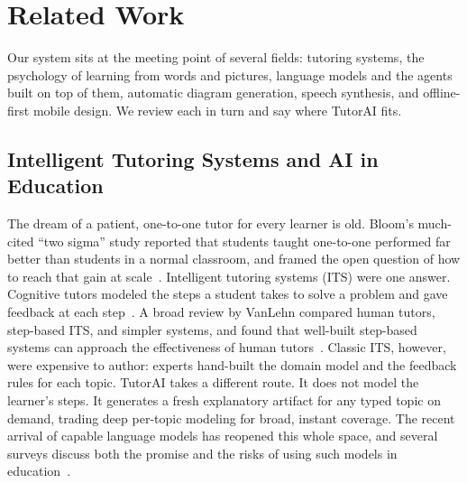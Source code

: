 \documentclass[conference]{IEEEtran}
\begin{document}
\section{Related Work}
\label{sec:related}

Our system sits at the meeting point of several fields: tutoring systems,
the psychology of learning from words and pictures, language models and the
agents built on top of them, automatic diagram generation, speech synthesis,
and offline-first mobile design. We review each in turn and say where TutorAI
fits.

\subsection{Intelligent Tutoring Systems and AI in Education}
The dream of a patient, one-to-one tutor for every learner is old. Bloom's
much-cited ``two sigma'' study reported that students taught one-to-one
performed far better than students in a normal classroom, and framed the open
question of how to reach that gain at scale~\cite{bloom1984}. Intelligent
tutoring systems (ITS) were one answer. Cognitive tutors modeled the steps a
student takes to solve a problem and gave feedback at each
step~\cite{anderson1995cognitive}. A broad review by VanLehn compared human
tutors, step-based ITS, and simpler systems, and found that well-built
step-based systems can approach the effectiveness of human
tutors~\cite{vanlehn2011}. Classic ITS, however, were expensive to author:
experts hand-built the domain model and the feedback rules for each topic.
TutorAI takes a different route. It does not model the learner's steps. It
generates a fresh explanatory artifact for any typed topic on demand, trading
deep per-topic modeling for broad, instant coverage. The recent arrival of
capable language models has reopened this whole space, and several surveys
discuss both the promise and the risks of using such models in
education~\cite{kasneci2023chatgpt}.
\end{document}
